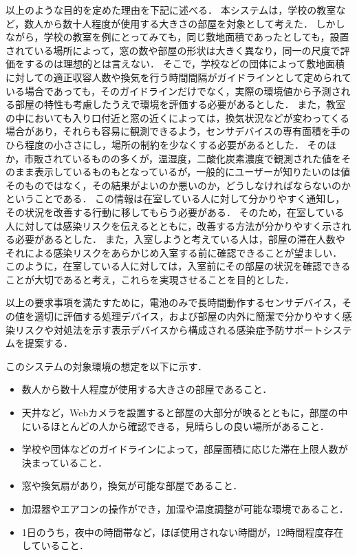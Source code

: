 以上のような目的を定めた理由を下記に述べる．
本システムは，学校の教室など，数人から数十人程度が使用する大きさの部屋を対象として考えた．
しかしながら，学校の教室を例にとってみても，同じ敷地面積であったとしても，設置されている場所によって，窓の数や部屋の形状は大きく異なり，同一の尺度で評価をするのは理想的とは言えない．
そこで，学校などの団体によって敷地面積に対しての適正収容人数や換気を行う時間間隔がガイドラインとして定められている場合であっても，そのガイドラインだけでなく，実際の環境値から予測される部屋の特性も考慮したうえで環境を評価する必要があるとした．
また，教室の中においても入り口付近と窓の近くによっては，換気状況などが変わってくる場合があり，それらも容易に観測できるよう，センサデバイスの専有面積を手のひら程度の小ささにし，場所の制約を少なくする必要があるとした．
そのほか，市販されているものの多くが，温湿度，二酸化炭素濃度で観測された値をそのまま表示しているものもとなっているが，一般的にユーザーが知りたいのは値そのものではなく，その結果がよいのか悪いのか，どうしなければならないのかということである．
この情報は在室している人に対して分かりやすく通知し，その状況を改善する行動に移してもらう必要がある．
そのため，在室している人に対しては感染リスクを伝えるとともに，改善する方法が分かりやすく示される必要があるとした．
また，入室しようと考えている人は，部屋の滞在人数やそれによる感染リスクをあらかじめ入室する前に確認できることが望ましい．
このように，在室している人に対しては，入室前にその部屋の状況を確認できることが大切であると考え，これらを実現させることを目的とした．

以上の要求事項を満たすために，電池のみで長時間動作するセンサデバイス，その値を適切に評価する処理デバイス，および部屋の内外に簡潔で分かりやすく感染リスクや対処法を示す表示デバイスから構成される感染症予防サポートシステムを提案する．

このシステムの対象環境の想定を以下に示す．
\begin{itemize}
    \item 数人から数十人程度が使用する大きさの部屋であること．
    \item 天井など，Webカメラを設置すると部屋の大部分が映るとともに，部屋の中にいるほとんどの人から確認できる，見晴らしの良い場所があること．
    \item 学校や団体などのガイドラインによって，部屋面積に応じた滞在上限人数が決まっていること．
    \item 窓や換気扇があり，換気が可能な部屋であること．
    \item 加湿器やエアコンの操作ができ，加湿や温度調整が可能な環境であること．
    \item 1日のうち，夜中の時間帯など，ほぼ使用されない時間が，12時間程度存在していること．
\end{itemize}

